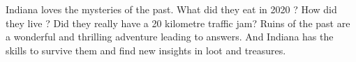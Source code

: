 \begin{npcBox}[title=Indiana - a Lost looter]
    \begin{stressSection}
    \end{stressSection}
    \begin{tabularx}{\textwidth}{ XX }
    \end{tabularx}

    \begin{consequences}
    \item {}
    \item {}
    \item {}
    \end{consequences}

    \begin{npcDescription}
    Indiana loves the mysteries of the past. What did they eat in 2020 ? How did they live ? Did they really have a 20 kilometre traffic jam?
    Ruins of the past are a wonderful and thrilling adventure leading to answers. And Indiana has the skills to survive them and find new insights in loot and treasures.
    \end{npcDescription}

\end{npcBox}


